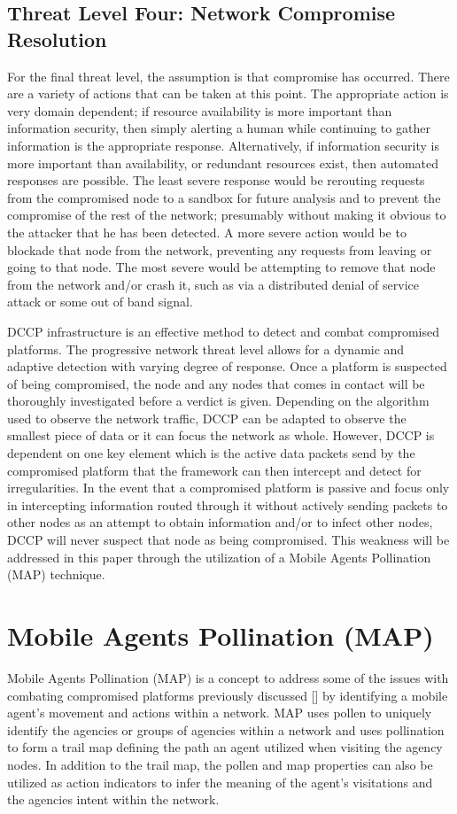 \documentclass{acm_proc_article-sp}
\begin{document}
\subsection{Threat Level Four: Network Compromise Resolution}
For the final threat level, the assumption is that compromise has occurred.  There are a variety of actions that can be taken at this point.  The appropriate action is very domain dependent; if resource availability is more important than information security, then simply alerting a human while continuing to gather information is the appropriate response.  Alternatively, if information security is more important than availability, or redundant resources exist, then automated responses are possible.  The least severe response would be rerouting requests from the compromised node to a sandbox for future analysis and to prevent the compromise of the rest of the network; presumably without making it obvious to the attacker that he has been detected.  A more severe action would be to blockade that node from the network, preventing any requests from leaving or going to that node.  The most severe would be attempting to remove that node from the network and/or crash it, such as via a distributed denial of service attack or some out of band signal.  

DCCP infrastructure is an effective method to detect and combat compromised platforms. The progressive network threat level allows for a dynamic and adaptive detection with varying degree of response. Once a platform is suspected of being compromised, the node and any nodes that comes in contact will be thoroughly investigated before a verdict is given. Depending on the algorithm used to observe the network traffic, DCCP can be adapted to observe the smallest piece of data or it can focus the network as whole. However, DCCP is dependent on one key element which is the active data packets send by the compromised platform that the framework can then intercept and detect for irregularities. In the event that a compromised platform is passive and focus only in intercepting information routed through it without actively sending packets to other nodes as an attempt to obtain information and/or to infect other nodes, DCCP will never suspect that node as being compromised. This weakness will be addressed in this paper through the utilization of a Mobile Agents Pollination (MAP) technique. 

\section{Mobile Agents Pollination (MAP)}
Mobile Agents Pollination (MAP) is a concept to address some of the issues with combating compromised platforms previously discussed [] by identifying a mobile agent’s movement and actions within a network. MAP uses pollen to uniquely identify the agencies or groups of agencies within a network and uses pollination to form a trail map defining the path an agent utilized when visiting the agency nodes. In addition to the trail map, the pollen and map properties can also be utilized as action indicators to infer the meaning of the agent’s visitations and the agencies intent within the network.
\end{document}
